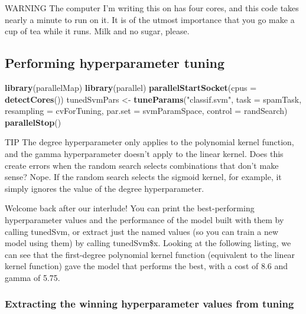 \documentclass[
]{article}
\newenvironment{Shaded}{\begin{snugshade}}{\end{snugshade}}
\newcommand{\AttributeTok}[1]{\textcolor[rgb]{0.13,0.29,0.53}{#1}}
\newcommand{\FunctionTok}[1]{\textcolor[rgb]{0.13,0.29,0.53}{\textbf{#1}}}
\newcommand{\NormalTok}[1]{#1}
\newcommand{\OtherTok}[1]{\textcolor[rgb]{0.56,0.35,0.01}{#1}}
\newcommand{\StringTok}[1]{\textcolor[rgb]{0.31,0.60,0.02}{#1}}
\begin{document}
WARNING The computer I'm writing this on has four cores, and this code
takes nearly a minute to run on it. It is of the utmost importance that
you go make a cup of tea while it runs. Milk and no sugar, please.

\subsection{Performing hyperparameter
tuning}\label{performing-hyperparameter-tuning}

\begin{Shaded}
\begin{Highlighting}[]
\FunctionTok{library}\NormalTok{(parallelMap)}
\FunctionTok{library}\NormalTok{(parallel)}
\FunctionTok{parallelStartSocket}\NormalTok{(}\AttributeTok{cpus =} \FunctionTok{detectCores}\NormalTok{())}
\NormalTok{tunedSvmPars }\OtherTok{\textless{}{-}} \FunctionTok{tuneParams}\NormalTok{(}\StringTok{"classif.svm"}\NormalTok{, }\AttributeTok{task =}\NormalTok{ spamTask,}
                           \AttributeTok{resampling =}\NormalTok{ cvForTuning,}
                           \AttributeTok{par.set =}\NormalTok{ svmParamSpace,}
                           \AttributeTok{control =}\NormalTok{ randSearch)}
\FunctionTok{parallelStop}\NormalTok{()}
\end{Highlighting}
\end{Shaded}

TIP The degree hyperparameter only applies to the polynomial kernel
function, and the gamma hyperparameter doesn't apply to the linear
kernel. Does this create errors when the random search selects
combinations that don't make sense? Nope. If the random search selects
the sigmoid kernel, for example, it simply ignores the value of the
degree hyperparameter.

Welcome back after our interlude! You can print the best-performing
hyperparameter values and the performance of the model built with them
by calling tunedSvm, or extract just the named values (so you can train
a new model using them) by calling tunedSvm\$x. Looking at the following
listing, we can see that the first-degree polynomial kernel function
(equivalent to the linear kernel function) gave the model that performs
the best, with a cost of 8.6 and gamma of 5.75.

\subsubsection{Extracting the winning hyperparameter values from
tuning}\label{extracting-the-winning-hyperparameter-values-from-tuning}
\end{document}
